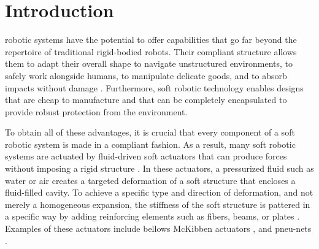\section{Introduction}
\label{sec:introduction}

 robotic systems have the potential to offer capabilities that go far beyond the repertoire of traditional rigid-bodied robots.
Their compliant structure allows them to adapt their overall shape to navigate unstructured environments, to safely work alongside humans, to manipulate delicate goods, and to absorb impacts without damage \cite{majidi2014soft}. 
Furthermore, soft robotic technology enables designs that are cheap to manufacture and that can be completely encapsulated to provide robust protection from the environment.


To obtain all of these advantages, it is crucial that every component of a soft robotic system is made in a compliant fashion.
As a result, many soft robotic systems are actuated by fluid-driven soft actuators that can produce forces without imposing a rigid structure \cite{grissom2006design, hawkes2017soft, marchese2014autonomous, tolley2014resilient}. 
In these actuators, a pressurized fluid such as water or air creates a targeted deformation of a soft structure that encloses a fluid-filled cavity. 
To achieve a specific type and direction of deformation, and not merely a homogeneous expansion, the stiffness of the soft structure is pattered in a specific way by adding reinforcing elements such as fibers, beams, or plates \cite{galloway2013mechanically, marchese2015recipe, rus2015design}. 
Examples of these actuators include bellows \cite{pridham1967bellows} McKibben actuators \cite{tondu2012modelling}, and pneu-nets \cite{mosadegh2014pneumatic}.


